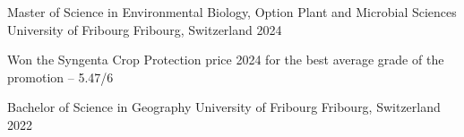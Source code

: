 

\begin{cventries}

  \cventry
    {Master of Science in Environmental Biology, Option Plant and Microbial Sciences} %
    {University of Fribourg} %
    {Fribourg, Switzerland} %
    {2024} %
    {
      \begin{cvitems} %
        \item {Won the Syngenta Crop Protection price 2024 for the best average grade of the promotion -- 5.47/6}
      \end{cvitems}
    }

  \cventry
    {Bachelor of Science in Geography} %
    {University of Fribourg} %
    {Fribourg, Switzerland} %
    {2022} %
    {}

\end{cventries}
